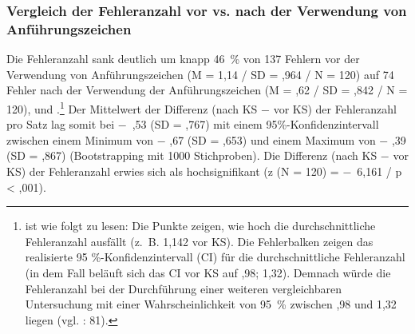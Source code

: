 \subsubsection{\label{sec:5.3.1.1}Vergleich der Fehleranzahl vor vs. nach der Verwendung von Anführungszeichen}

Die Fehleranzahl sank deutlich um knapp 46~\% von 137 Fehlern vor der Verwendung von Anführungszeichen (M = 1,14 / SD = ,964 / N = 120) auf 74 Fehler nach der Verwendung der Anführungszeichen (M = ,62 / SD = ,842 / N = 120),  und .\footnote{ ist wie folgt zu lesen: Die Punkte zeigen, wie hoch die durchschnittliche Fehleranzahl ausfällt (z.~B. 1,142 vor KS). Die Fehlerbalken zeigen das realisierte 95 \%-Konfidenzintervall (CI) für die durchschnittliche Fehleranzahl (in dem Fall beläuft sich das CI vor KS auf ,98; 1,32). Demnach würde die Fehleranzahl bei der Durchführung einer weiteren vergleichbaren Untersuchung mit einer Wahrscheinlichkeit von 95~\% zwischen ,98 und 1,32 liegen (vgl. \citealt{Eckstein2008}: 81).} Der Mittelwert der Differenz (nach KS $-$ vor KS) der Fehleranzahl pro Satz lag somit bei $-$~,53 (SD = ,767) mit einem 95\%\nobreakdash-Konfidenzintervall zwischen einem Minimum von $-$ ,67 (SD = ,653) und einem Maximum von $-$ ,39 (SD = ,867) (Bootstrapping mit 1000 Stichproben). Die Differenz (nach KS $-$ vor KS) der Fehleranzahl erwies sich als hochsignifikant (z (N = 120) = $-$~6,161 / p < ,001).


